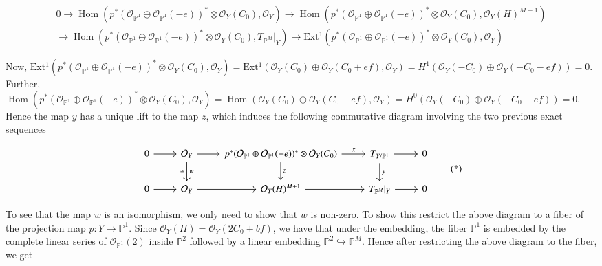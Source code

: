 \documentclass[11pt,twoside]{amsart}
\theoremstyle{plain}
\numberwithin{equation}{section}
\theoremstyle{definition}
\begin{document}
\begin{multline*}
0 \to \operatorname{Hom}(p^*(\mathcal{O}_{\mathbb{P}^1} \oplus \mathcal{O}_{\mathbb{P}^1}(-e))^* \otimes \mathcal{O}_{Y}(C_0), \mathcal{O}_Y) \to \operatorname{Hom}(p^*(\mathcal{O}_{\mathbb{P}^1} \oplus \mathcal{O}_{\mathbb{P}^1}(-e))^* \otimes \mathcal{O}_{Y}(C_0), \mathcal{O}_Y(H)^{M+1}) \\ \to \operatorname{Hom}(p^*(\mathcal{O}_{\mathbb{P}^1} \oplus \mathcal{O}_{\mathbb{P}^1}(-e))^* \otimes \mathcal{O}_Y(C_0), T_{\mathbb{P}^M}|_Y) \to \operatorname{Ext^1}(p^*(\mathcal{O}_{\mathbb{P}^1} \oplus \mathcal{O}_{\mathbb{P}^1}(-e))^* \otimes \mathcal{O}_Y(C_0), \mathcal{O}_Y)
\end{multline*}

Now, $\operatorname{Ext^1}(p^*(\mathcal{O}_{\mathbb{P}^1} \oplus \mathcal{O}_{\mathbb{P}^1}(-e))^* \otimes \mathcal{O}_Y(C_0), \mathcal{O}_Y) = \operatorname{Ext^1}(\mathcal{O}_Y(C_0) \oplus \mathcal{O}_Y(C_0+ef), \mathcal{O}_Y) = H^1(\mathcal{O}_Y(-C_0) \oplus \mathcal{O}_Y(-C_0-ef)) = 0$.
Further, $\operatorname{Hom}(p^*(\mathcal{O}_{\mathbb{P}^1} \oplus \mathcal{O}_{\mathbb{P}^1}(-e))^* \otimes \mathcal{O}_Y(C_0), \mathcal{O}_Y) = \operatorname{Hom}(\mathcal{O}_Y(C_0) \oplus \mathcal{O}_Y(C_0+ef), \mathcal{O}_Y) = H^0(\mathcal{O}_Y(-C_0) \oplus \mathcal{O}_Y(-C_0-ef)) = 0$. Hence the map $y$ has a unique lift to the map $z$, which induces the following commutative diagram involving the two previous exact sequences

\begin{equation}
\begin{tikzcd}
  0 \arrow[r] & \mathcal{O}_Y \arrow[r] \arrow[d, "w", "\cong"'] & p^*(\mathcal{O}_{\mathbb{P}^1} \oplus \mathcal{O}_{\mathbb{P}^1}(-e))^* \otimes \mathcal{O}_Y(C_0) \arrow[r, "x"] \arrow[d, "z"] & T_{Y/\mathbb{P}^1} \arrow[r] \arrow[d, "y"] & 0 \\
   0 \arrow[r] & \mathcal{O}_Y \arrow[r] & \mathcal{O}_Y(H)^{M+1} \arrow[r] & T_{\mathbb{P}^M}|_Y \arrow[r] & 0
\end{tikzcd}
\tag{*}\label{diag:star}
\end{equation}

To see that the map $w$ is an isomorphism, we only need to show that $w$ is non-zero. To show this restrict the above diagram to a fiber of the projection map $p: Y \to \mathbb{P}^1$. Since $\mathcal{O}_Y(H) = \mathcal{O}_Y(2C_0+bf)$, we have that under the embedding, the fiber $\mathbb{P}^1$ is embedded by the complete linear series of $\mathcal{O}_{\mathbb{P}^1}(2)$ inside $\mathbb{P}^2$ followed \textcolor{black}{by} a linear embedding $\mathbb{P}^2 \hookrightarrow \mathbb{P}^M$. Hence after restricting the above diagram to the fiber, we get
\end{document}
